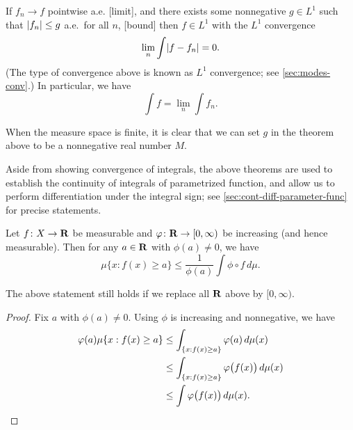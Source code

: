 \begin{namedthm} \label{thm:DCT}
    If $f_n \to f$ pointwise a.e. [limit], and there exists some nonnegative $g \in L^1$ such that $\abs{f_n} \leq g$ a.e.\ for all $n$, [bound]
    then $f \in L^1$ with the $L^1$ convergence \[
        \lim_n \int \abs{f - f_n} = 0.
    \] (The type of convergence above is known as $L^1$ convergence; see \cref{sec:modes-conv}.) In particular, we have \[
        \int f = \lim_n \int f_n.
    \]
    
\end{namedthm}

\begin{namedthm} \label{thm:bdd-conv}
    When the measure space is finite, it is clear that we can set $g$ in the theorem above to be a nonnegative real number $M$.
\end{namedthm}


Aside from showing convergence of integrals, the above theorems are used to establish the continuity of integrals of parametrized function, and allow us to perform differentiation under the integral sign; see \cref{sec:cont-diff-parameter-func} for precise statements.

\begin{namedthm} \label{thm:Markov-ms}
    Let $f\colon X \to \R$ be measurable and $\phi\colon \R \to [0,\infty)$ be increasing (and hence measurable). Then for any $a\in \R$ with $\phi(a)\neq 0$, we have \[
        \mu\{x:f(x) \geq a\} \leq \frac{1}{\phi(a)}\int \phi\circ f\,d\mu.
    \]

    The above statement still holds if we replace all $\R$ above by $[0,\infty)$.
\end{namedthm}
\begin{proof}
    Fix $a$ with $\phi(a)\neq 0$. Using $\phi$ is increasing and nonnegative, we have \begin{align*}
        \phi(a)\mu\{x:f(x) \geq a\} & \leq \int_{\{x:f(x) \geq a\}} \phi(a)\,d\mu(x) \\
        & \leq \int_{\{x:f(x) \geq a\}} \phi\bigl(f(x)\bigr)\,d\mu(x) \\
        & \leq \int \phi\bigl(f(x)\bigr)\,d\mu(x). \qedhere
    \end{align*}
\end{proof}

